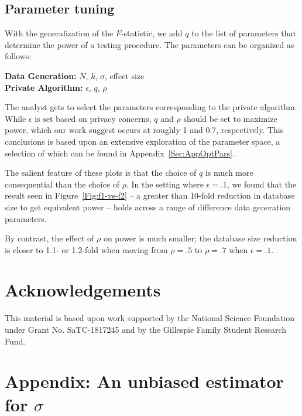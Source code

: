 \documentclass[USenglish,oneside]{article}
\newcounter{ab}
\newcounter{ar}
\newcounter{ms}
\begin{document}
\subsection{Parameter tuning}\label{subsec:params}

With the generalization of the $F$-statistic, we add $q$ to the list of parameters that determine the power of a testing procedure. The parameters can be organized as follows:

\vspace{3mm}
\textbf{Data Generation:} $N$, $k$, $\sigma$, effect size \\
\indent\textbf{Private Algorithm:} $\epsilon$, $q$, $\rho$
\vspace{3mm}

The analyst gets to select the parameters corresponding to the private algorithm. While
$\epsilon$ is set based on privacy concerns, $q$ and $\rho$ should be set to 
maximize power, which our work suggest occurs at roughly 1 and 0.7, respectively.
This conclusions is based upon an extensive exploration of the parameter space, 
a selection of which can be found in Appendix~\ref{Sec:AppOptPars}.

The salient feature of these plots is that the choice of $q$ is much more 
consequential than the choice of $\rho$. In the setting where $\epsilon = .1$, 
we found that the result seen in Figure~\ref{Fig:f1-vs-f2} -- a greater than 
10-fold reduction in database size to get equivalent power -- holds across a range
of difference data generation parameters.

By contrast, the effect of $\rho$ on power is much smaller; the database size
reduction is closer to 1.1- or 1.2-fold when moving from $\rho = .5$ to $\rho = .7$
when $\epsilon = .1$.



\section*{Acknowledgements}
This material is based upon work supported by the National Science Foundation under Grant No. SaTC-1817245 and by the Gillespie Family Student Research Fund.




\appendix


\section{Appendix: An unbiased estimator for $\sigma$}
\label{Sec:AppSig}
\end{document}
